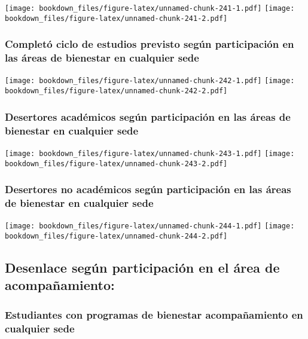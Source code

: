 \documentclass[]{article}
\theoremstyle{definition}
\theoremstyle{definition}
\theoremstyle{definition}
\theoremstyle{remark}
\begin{document}
\texttt{[image: bookdown\_files/figure-latex/unnamed-chunk-241-1.pdf]}
\texttt{[image: bookdown\_files/figure-latex/unnamed-chunk-241-2.pdf]}

\subsubsection{Completó ciclo de estudios previsto según participación
en las áreas de bienestar en cualquier
sede}\label{completo-ciclo-de-estudios-previsto-segun-participacion-en-las-areas-de-bienestar-en-cualquier-sede}

\texttt{[image: bookdown\_files/figure-latex/unnamed-chunk-242-1.pdf]}
\texttt{[image: bookdown\_files/figure-latex/unnamed-chunk-242-2.pdf]}

\subsubsection{Desertores académicos según participación en las áreas de
bienestar en cualquier
sede}\label{desertores-academicos-segun-participacion-en-las-areas-de-bienestar-en-cualquier-sede}

\texttt{[image: bookdown\_files/figure-latex/unnamed-chunk-243-1.pdf]}
\texttt{[image: bookdown\_files/figure-latex/unnamed-chunk-243-2.pdf]}

\subsubsection{Desertores no académicos según participación en las áreas
de bienestar en cualquier
sede}\label{desertores-no-academicos-segun-participacion-en-las-areas-de-bienestar-en-cualquier-sede}

\texttt{[image: bookdown\_files/figure-latex/unnamed-chunk-244-1.pdf]}
\texttt{[image: bookdown\_files/figure-latex/unnamed-chunk-244-2.pdf]}

\subsection{Desenlace según participación en el área de
acompañamiento:}\label{desenlace-segun-participacion-en-el-area-de-acompanamiento-1}

\subsubsection{Estudiantes con programas de bienestar acompañamiento en
cualquier
sede}\label{estudiantes-con-programas-de-bienestar-acompanamiento-en-cualquier-sede-1}
\end{document}
